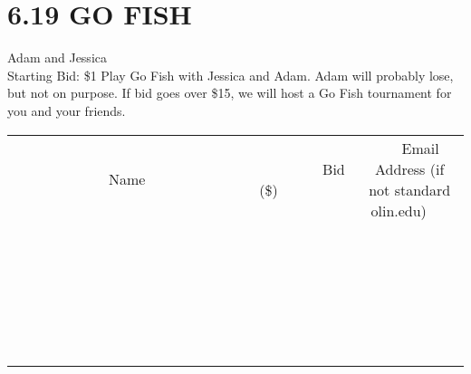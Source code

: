 \documentclass[11pt]{article}
\begin{document}
\section*{6.19 GO FISH}
Adam and Jessica
\\
Starting Bid: \$1
\newline
Play Go Fish with Jessica and Adam. Adam will probably lose, but not on purpose. 
If bid goes over \$15, we will host a Go Fish tournament for you and your friends.
\\[6ex]
\begin{tabular}{c c c}
~~~~~~~~~~~~~Name~~~~~~~~~~~~~ & ~~~~~~~~~Bid (\$)~~~~~~~~~  & ~~~Email Address (if not standard olin.edu)~~~\\
 & & \\
\hline
 & & \\
\hline
 & & \\
\hline
 & & \\
\hline
 & & \\
\hline
 & & \\
\hline
 & & \\
\hline
 & & \\
\hline
 & & \\
\hline
 & & \\
\hline
 & & \\
\hline
 & & \\
\hline
 & & \\
\hline
 & & \\
\hline
 & & \\
\hline
 & & \\
\hline
 & & \\
\hline
 & & \\
\hline
 & & \\
\hline
 & & \\
\hline
 & & \\
\hline
 & & \\
\hline
 & & \\
\hline
 & & \\
\hline
 & & \\
\hline
 & & \\
\hline
\end{tabular}
\newpage
\end{document}
